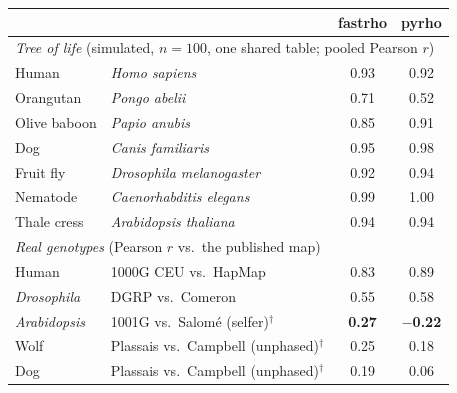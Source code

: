 \begin{tabular}{llcc}
\toprule
 & & fastrho & pyrho \\
\midrule
\multicolumn{4}{l}{\emph{Tree of life} (simulated, $n{=}100$, one shared table; pooled Pearson $r$)} \\
\quad Human        & \emph{Homo sapiens}            & 0.93 & 0.92 \\
\quad Orangutan    & \emph{Pongo abelii}            & 0.71 & 0.52 \\
\quad Olive baboon & \emph{Papio anubis}            & 0.85 & 0.91 \\
\quad Dog          & \emph{Canis familiaris}        & 0.95 & 0.98 \\
\quad Fruit fly    & \emph{Drosophila melanogaster} & 0.92 & 0.94 \\
\quad Nematode     & \emph{Caenorhabditis elegans}  & 0.99 & 1.00 \\
\quad Thale cress  & \emph{Arabidopsis thaliana}    & 0.94 & 0.94 \\
\midrule
\multicolumn{4}{l}{\emph{Real genotypes} (Pearson $r$ vs.\ the published map)} \\
\quad Human        & 1000G CEU vs.\ HapMap          & 0.83 & 0.89 \\
\quad \emph{Drosophila} & DGRP vs.\ Comeron        & 0.55 & 0.58 \\
\quad \emph{Arabidopsis} & 1001G vs.\ Salom\'e (selfer)$^{\dagger}$ & \textbf{0.27} & \textbf{$-$0.22} \\
\quad Wolf         & Plassais vs.\ Campbell (unphased)$^{\dagger}$ & 0.25 & 0.18 \\
\quad Dog          & Plassais vs.\ Campbell (unphased)$^{\dagger}$ & 0.19 & 0.06 \\
\bottomrule
\end{tabular}
